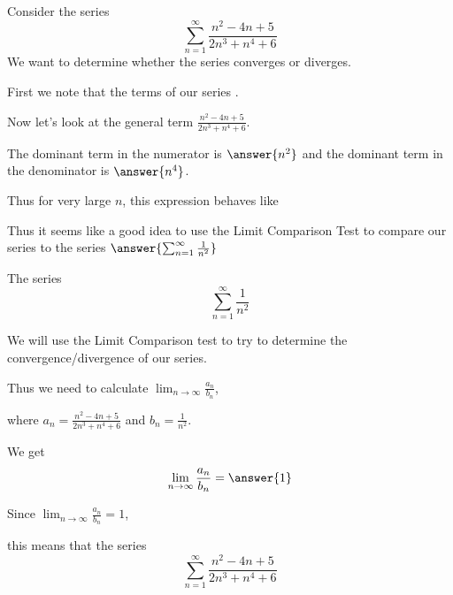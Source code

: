 \documentclass{ximera}
\author{Jim Talamo,Jason Miller}
\begin{document}
\begin{exercise}

Consider the series 
\[
\sum^{\infty}_{n=1} \frac{n^2-4n+5}{2n^3+n^4+6}
\]
We want to determine whether the series converges or diverges. 


First we note that the terms of our series . 

Now let's look at the general term $ \frac{n^2-4n+5}{2n^3+n^4+6}$.

The dominant term in the numerator is $\answer{ n^2}$ and the dominant term 
in the denominator is $\answer{n^4}$. 

Thus for very large $n$, this expression behaves like 

\begin{multipleChoice}
\end{multipleChoice}

\begin{exercise}

Thus it seems like a good idea to use the Limit Comparison Test to compare our series to 
the series $ \answer{\sum^{\infty}_{n=1} \frac{1}{n^2}}$


\begin{exercise}
The series
\[
\sum^{\infty}_{n=1} \frac{1}{n^2}
\]

\begin{multipleChoice}
\end{multipleChoice}



\begin{exercise}

We will use the Limit Comparison test to try to determine the convergence/divergence of our series. 

Thus we need to calculate $\lim_{n \to \infty} \frac{a_n}{b_n}$,

where $a_n=\frac{n^2-4n+5}{2n^3+n^4+6}$ and $b_n=\frac{1}{n^2}$. 

We get 
\[
\lim_{n \to \infty} \frac{a_n}{b_n}=\answer{  1 }
\]


\begin{exercise}
Since $\lim_{n \to \infty} \frac{a_n}{b_n}=1$, 

this means that the series
\[
\sum^{\infty}_{n=1}\frac{n^2-4n+5}{2n^3+n^4+6}
\]


\begin{multipleChoice}
\end{multipleChoice}



\end{exercise}
\end{exercise}
\end{exercise}
\end{exercise}
\end{exercise}
\end{document}
